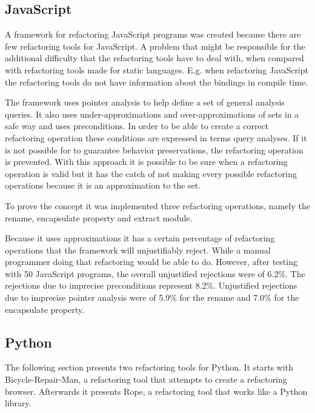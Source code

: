 \subsection{JavaScript}

A framework \cite{feldthaus2011tool} for refactoring JavaScript programs was created because there are few refactoring tools for JavaScript. 
A problem that might be responsible for the additional difficulty that the refactoring tools have to deal with, when compared with refactoring tools made for static languages. 
E.g. when refactoring JavaScript the refactoring tools do not have information about the bindings in compile time.



The framework uses pointer analysis to help define a set of general analysis queries. 
It also uses under-approximations and over-approximations of sets in a safe way and uses preconditions.
In order to be able to create a correct refactoring operation these conditions are expressed in terms query analyses. 
If it is not possible for to guarantee behavior preservations, the refactoring operation is prevented.
With this approach it is possible to be sure when a refactoring operation is valid but it has the catch of not making every possible refactoring operations because it is an approximation to the set.

To prove the concept it was implemented three refactoring operations, namely the rename, encapsulate property and extract module.


Because it uses approximations it has a certain percentage of refactoring operations that the framework will unjustifiably reject.
While a manual programmer doing that refactoring would be able to do. 
However, after testing with 50 JavaScript programs, the overall unjustified rejections were of 6.2\%. 
The rejections due to imprecise preconditions represent 8.2\%.
Unjustified rejections due to imprecise pointer analysis were of 5.9\% for the rename and 7.0\% for the encapsulate property. 


\subsection{Python}

The following section presents two refactoring tools for Python. 
It starts with Bicycle-Repair-Man, a refactoring tool that attempts to create a refactoring browser. 
Afterwards it presents Rope, a refactoring tool that works like a Python library.

